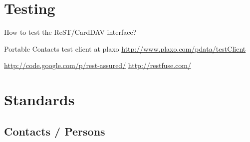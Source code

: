 \documentclass[12pt,a4paper]{scrartcl}		%
\begin{document}

\section{Testing}
How to test the ReST/CardDAV interface?


Portable Contacts test client at plaxo \url{http://www.plaxo.com/pdata/testClient}

\url{http://code.google.com/p/rest-assured/} \url{http://restfuse.com/}

\appendix

\section{Standards}
\subsection{Contacts / Persons}

\end{document}
